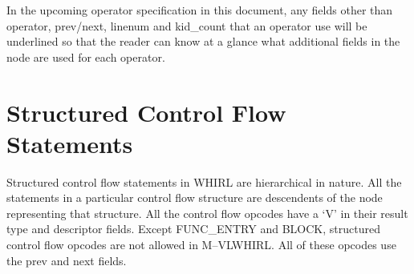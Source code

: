 \documentclass{article}
\begin{document}
In the upcoming operator specification in this document, any fields
other than operator, prev/next, linenum and kid\_count that an operator
use will be underlined so that the reader can know at a glance what
additional fields in the node are used for each operator.

\section{Structured Control Flow Statements}

Structured control flow statements in WHIRL are hierarchical in
nature. All the statements in a particular control flow structure
are descendents of the node representing that structure. All the
control flow opcodes have a `V' in their result type and descriptor
fields. Except FUNC\_ENTRY and BLOCK, structured control flow opcodes are not
allowed in M--VLWHIRL. All of these opcodes use the prev and next
fields.
\end{document}
